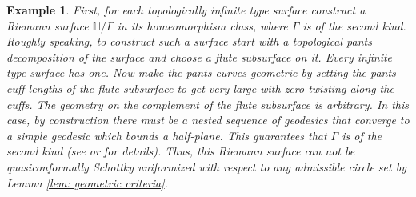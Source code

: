 \documentclass[12pt]{amsart}
\theoremstyle{plain}
\newtheorem{exam}[thm]{Example}
\begin{document}
\begin{exam}\label{Ex2}
{\rm 
First, for each topologically infinite type surface construct a 
Riemann surface $\mathbb{H}/\Gamma$ in its homeomorphism class, where $\Gamma$ is of the  second kind. Roughly speaking, to construct such a surface start with a topological pants decomposition of the surface and choose a flute subsurface on it. Every infinite type surface has one. Now make the pants curves    geometric by setting the pants cuff lengths of the flute subsurface to get very large with zero twisting along the cuffs. The geometry on the complement  of the flute subsurface is arbitrary.  In this  case, by construction  there must be a nested sequence of geodesics that converge to a simple geodesic  which bounds a half-plane.  This guarantees that $\Gamma$ is of the second kind (see \cite{Ba} or \cite{B-S} for details).
Thus, this  Riemann surface can not be quasiconformally Schottky uniformized with respect to any admissible circle set by Lemma \ref{lem: geometric criteria}.
}
\end{exam}



%

%
%
%
\end{document}

